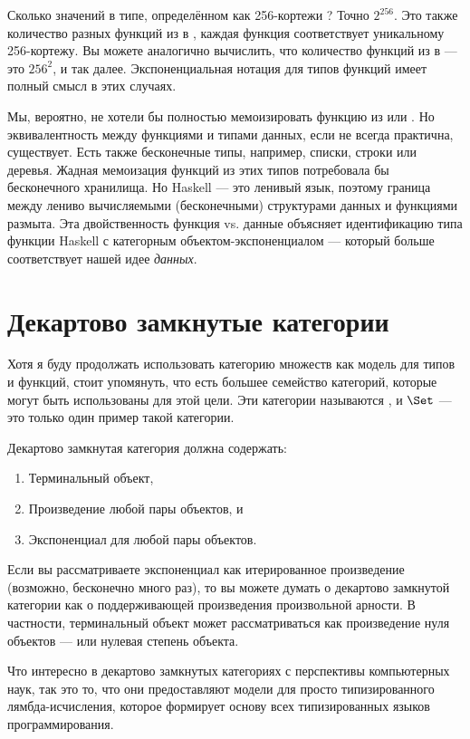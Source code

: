 Сколько значений в типе, определённом как 256-кортежи
? Точно $2^{256}$. Это также количество
разных функций из  в , каждая
функция соответствует уникальному 256-кортежу. Вы можете аналогично
вычислить, что количество функций из  в
 --- это $256^{2}$, и так далее. Экспоненциальная
нотация для типов функций имеет полный смысл в этих случаях.

Мы, вероятно, не хотели бы полностью мемоизировать функцию из 
или . Но эквивалентность между функциями и типами
данных, если не всегда практична, существует. Есть также бесконечные типы,
например, списки, строки или деревья. Жадная мемоизация функций
из этих типов потребовала бы бесконечного хранилища. Но Haskell --- это ленивый
язык, поэтому граница между лениво вычисляемыми (бесконечными) структурами
данных и функциями размыта. Эта двойственность функция vs. данные
объясняет идентификацию типа функции Haskell с
категорным объектом-экспоненциалом --- который больше соответствует нашей идее
\emph{данных}.

\section{Декартово замкнутые категории}

Хотя я буду продолжать использовать категорию множеств как модель для типов
и функций, стоит упомянуть, что есть большее семейство
категорий, которые могут быть использованы для этой цели. Эти категории
называются , и $\Set$ --- это только один пример
такой категории.

Декартово замкнутая категория должна содержать:

\begin{enumerate}
  \tightlist
  \item
        Терминальный объект,
  \item
        Произведение любой пары объектов, и
  \item
        Экспоненциал для любой пары объектов.
\end{enumerate}
Если вы рассматриваете экспоненциал как итерированное произведение (возможно,
бесконечно много раз), то вы можете думать о декартово замкнутой
категории как о поддерживающей произведения произвольной арности. В
частности, терминальный объект может рассматриваться как произведение нуля
объектов --- или нулевая степень объекта.

Что интересно в декартово замкнутых категориях с
перспективы компьютерных наук, так это то, что они предоставляют модели для
просто типизированного лямбда-исчисления, которое формирует основу всех типизированных
языков программирования.

